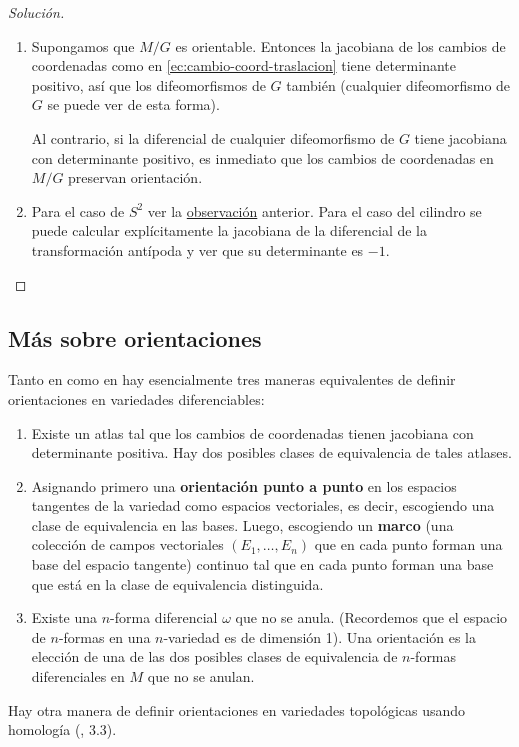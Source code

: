 \documentclass[spanish]{book}
\theoremstyle{definition}
\begin{document}
\begin{proof}[Solución]
\begin{enumerate}
			\item Supongamos que $M/G$ es orientable. Entonces la jacobiana de los cambios de coordenadas como en \ref{ec:cambio-coord-traslacion} tiene determinante positivo, así que los difeomorfismos de $G$ también (cualquier difeomorfismo de $G$ se puede ver de esta forma).
			
			Al contrario, si la diferencial de cualquier difeomorfismo de $G$ tiene jacobiana con determinante positivo, es inmediato que los cambios de coordenadas en $M/G$ preservan orientación.
			
			\item Para el caso de $S^2$ ver la \hyperref[obs:antipoda-orientacion]{observación} anterior. Para el caso del cilindro se puede calcular explícitamente la jacobiana de la diferencial de la transformación antípoda y ver que su determinante es $-1$.
		\end{enumerate}
	\end{proof}
	
	\subsection{Más sobre orientaciones}
	Tanto en \cite{Lee} como en \cite{Loring} hay esencialmente tres maneras equivalentes de definir orientaciones en variedades diferenciables:
	\begin{enumerate}
		\item Existe un atlas tal que los cambios de coordenadas tienen jacobiana con determinante positiva. Hay dos posibles clases de equivalencia de tales atlases.
		\item Asignando primero una \textbf{orientación punto a punto} en los espacios tangentes de la variedad como espacios vectoriales, es decir, escogiendo una clase de equivalencia en las bases. Luego, escogiendo un \textbf{marco} (una colección de campos vectoriales $(E_1,\ldots,E_n)$ que en cada punto forman una base del espacio tangente) continuo tal que en cada punto forman una base que está en la clase de equivalencia distinguida.
		\item Existe una $n$-forma diferencial $\omega$ que no se anula. (Recordemos que el espacio de $n$-formas en una $n$-variedad es de dimensión 1). Una orientación es la elección de una de las dos posibles  clases de equivalencia de $n$-formas diferenciales en $M$ que no se anulan.
	\end{enumerate}
	Hay otra manera de definir orientaciones en variedades topológicas usando homología (\cite{Hatcher}, 3.3).
	
\end{document}

